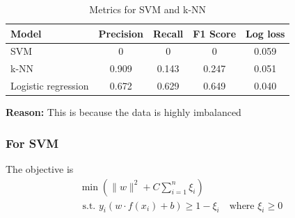 \documentclass[letterpaper, 11 pt, conference]{ieeeconf}  %
\begin{document}
\begin{table}[h]
    \centering
    \begin{tabular}{|l|c|c|c|c|}
    \hline
         Model &  Precision & Recall & F1 Score & Log loss
         \\\hline
         SVM & 0 & 0 & 0 & 0.059 \\
         k-NN & 0.909 & 0.143 & 0.247 & 0.051\\
         Logistic regression & 0.672 & 0.629 & 0.649 & 0.040\\\hline
         
    \end{tabular}
    \caption{Metrics for SVM and k-NN}
    \label{tab:metric1}
\end{table}



\textbf{Reason:}
This is because the data is highly imbalanced
\subsubsection{For SVM} The objective is 
\begin{multline}
\min(\|w\|^{2} + C \sum_{i=1}^{n} \xi_{i})\\ \text{ s.t. } y_i (w \cdot f(x_i) + b) \geq 1 - \xi_i \quad \text{where   } \xi_i \geq 0
\label{eq:SVM}
\end{multline}
\end{document}
